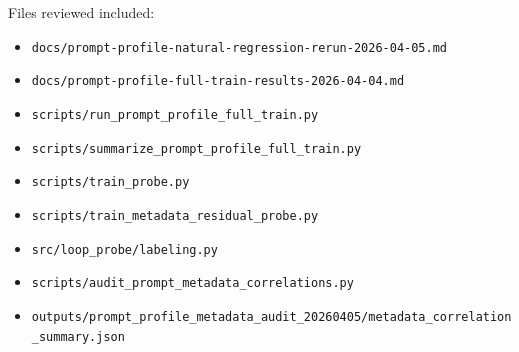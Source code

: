\documentclass[11pt]{article}
\begin{document}
Files reviewed included:
\begin{itemize}[leftmargin=1.5em]
\item \texttt{docs/prompt-profile-natural-regression-rerun-2026-04-05.md}
\item \texttt{docs/prompt-profile-full-train-results-2026-04-04.md}
\item \texttt{scripts/run\_prompt\_profile\_full\_train.py}
\item \texttt{scripts/summarize\_prompt\_profile\_full\_train.py}
\item \texttt{scripts/train\_probe.py}
\item \texttt{scripts/train\_metadata\_residual\_probe.py}
\item \texttt{src/loop\_probe/labeling.py}
\item \texttt{scripts/audit\_prompt\_metadata\_correlations.py}
\item \texttt{outputs/prompt\_profile\_metadata\_audit\_20260405/metadata\_correlation\_summary.json}
\end{itemize}
\end{document}
